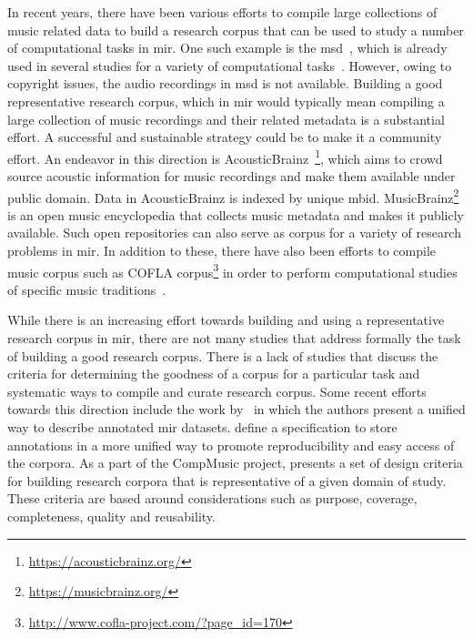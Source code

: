 In recent years, there have been various efforts to compile large collections of music related data to build a research corpus that can be used to study a number of computational tasks in \gls{mir}. One such example is the \gls{msd}~\citep{Bertin-Mahieux2011}, which is already used in several studies for a variety of computational tasks~\citep{serra2012measuring,sturm2012survey}. However, owing to copyright issues, the audio recordings in \gls{msd} is not available. Building a good representative research corpus, which in \gls{mir} would typically mean compiling a large collection of music recordings and their related metadata is a substantial effort. A successful and sustainable strategy could be to make it a community effort. An endeavor in this direction is AcousticBrainz~\citep{porter2015acousticbrainz}\footnote{\url{https://acousticbrainz.org/}}, which aims to crowd source acoustic information for music recordings and make them available under public domain. Data in AcousticBrainz is indexed by unique \gls{mbid}. MusicBrainz\footnote{\url{https://musicbrainz.org/}} is an open music encyclopedia that collects music metadata and makes it publicly available. Such open repositories can also serve as corpus for a variety of research problems in \gls{mir}. In addition to these, there have also been efforts to compile music corpus such as COFLA corpus\footnote{\url{http://www.cofla-project.com/?page_id=170}} in order to perform computational studies of specific music traditions~\citep{kroher2016corpus}.

While there is an increasing effort towards building and using a representative research corpus in \gls{mir}, there are not many studies that address formally the task of building a good research corpus. There is a lack of studies that discuss the criteria for determining the goodness of a corpus for a particular task and systematic ways to compile and curate research corpus. Some recent efforts towards this direction include the work by~\cite{peeters2012towards} in which the authors present a unified way to describe annotated \Gls{mir} datasets. \cite{Humphrey:JAMS:ISMIR:14} define a specification to store annotations in a more unified way to promote reproducibility and easy access of the corpora. As a part of the CompMusic project, \cite{serra:14:corpus} presents a set of design criteria for building research corpora that is representative of a given domain of study. These criteria are based around considerations such as purpose, coverage, completeness, quality and reusability.

